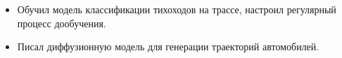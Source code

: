 \begin{itemize}
    \item Обучил модель классификации тихоходов на трассе, настроил регулярный процесс дообучения.
    \item Писал диффузионную модель для генерации траекторий автомобилей.
\end{itemize}
